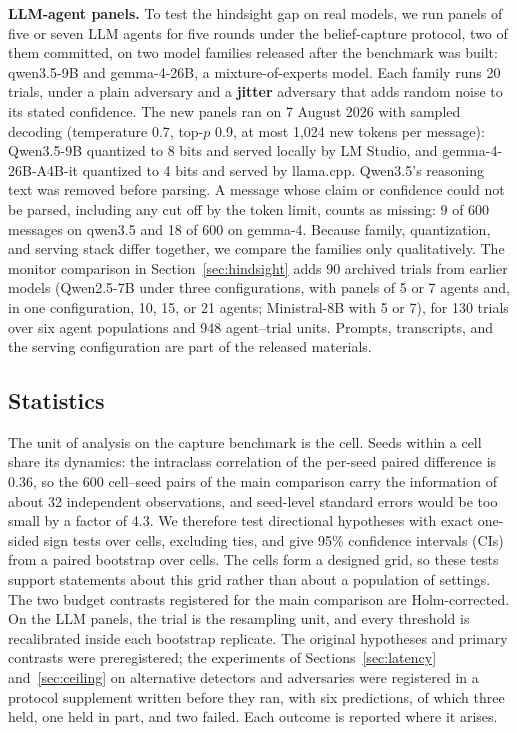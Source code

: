 \documentclass[pdflatex,sn-mathphys-num]{sn-jnl}
\theoremstyle{thmstyleone}%
\begin{document}
\textbf{LLM-agent panels.} To test the hindsight gap on real models, we run panels of five or seven LLM agents for five rounds under the belief-capture protocol, two of them committed, on two model families released after the benchmark was built: qwen3.5-9B and gemma-4-26B, a mixture-of-experts model. Each family runs 20 trials, under a plain adversary and a \textbf{jitter} adversary that adds random noise to its stated confidence. The new panels ran on 7 August 2026 with sampled decoding (temperature 0.7, top-$p$ 0.9, at most 1{,}024 new tokens per message): Qwen3.5-9B quantized to 8 bits and served locally by LM Studio, and gemma-4-26B-A4B-it quantized to 4 bits and served by llama.cpp. Qwen3.5's reasoning text was removed before parsing. A message whose claim or confidence could not be parsed, including any cut off by the token limit, counts as missing: 9 of 600 messages on qwen3.5 and 18 of 600 on gemma-4. Because family, quantization, and serving stack differ together, we compare the families only qualitatively. The monitor comparison in Section~\ref{sec:hindsight} adds 90 archived trials from earlier models (Qwen2.5-7B under three configurations, with panels of 5 or 7 agents and, in one configuration, 10, 15, or 21 agents; Ministral-8B with 5 or 7), for 130 trials over six agent populations and 948 agent--trial units. Prompts, transcripts, and the serving configuration are part of the released materials.

\subsection{Statistics}
The unit of analysis on the capture benchmark is the cell. Seeds within a cell share its dynamics: the intraclass correlation of the per-seed paired difference is 0.36, so the 600 cell--seed pairs of the main comparison carry the information of about 32 independent observations, and seed-level standard errors would be too small by a factor of 4.3. We therefore test directional hypotheses with exact one-sided sign tests over cells, excluding ties, and give 95\% confidence intervals (CIs) from a paired bootstrap over cells. The cells form a designed grid, so these tests support statements about this grid rather than about a population of settings. The two budget contrasts registered for the main comparison are Holm-corrected. On the LLM panels, the trial is the resampling unit, and every threshold is recalibrated inside each bootstrap replicate. The original hypotheses and primary contrasts were preregistered; the experiments of Sections~\ref{sec:latency} and~\ref{sec:ceiling} on alternative detectors and adversaries were registered in a protocol supplement written before they ran, with six predictions, of which three held, one held in part, and two failed. Each outcome is reported where it arises.
\end{document}
